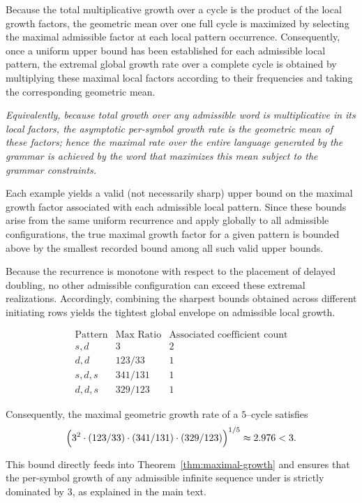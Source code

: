 \documentclass[12pt, oneside]{article}   	%
\numberwithin{equation}{section}          %
\theoremstyle{definition}
\begin{document}
Because the total multiplicative growth over a cycle is the product of the local
growth factors, the geometric mean over one full cycle is maximized by selecting
the maximal admissible factor at each local pattern occurrence. Consequently,
once a uniform upper bound has been established for each admissible local pattern,
the extremal global growth rate over a complete cycle is obtained by multiplying
these maximal local factors according to their frequencies and taking the
corresponding geometric mean.

\emph{Equivalently, because total growth over any admissible word is multiplicative in
its local factors, the asymptotic per-symbol growth rate is the geometric mean of these
factors;  hence the maximal rate over the entire language generated by the grammar is
achieved by the word that maximizes this mean subject to the grammar constraints.}

Each example yields a valid (not necessarily sharp) upper bound on the maximal growth
factor associated with each admissible local pattern.  Since these bounds arise from
the same uniform recurrence and apply globally to all admissible configurations, the
true maximal growth factor for a given pattern is bounded above by the smallest
recorded bound among all such valid upper bounds.

Because the recurrence is monotone with respect to the placement of delayed doubling,
no other admissible configuration can exceed these extremal realizations.
Accordingly, combining the sharpest bounds obtained across different initiating
rows yields the tightest global envelope on admissible local growth.

\[
\begin{array}{c|c|c}
\text{Pattern} & \text{Max Ratio} & \text{Associated coefficient count} \\
\hline
s,d & 3 & 2 \\
d,d & 123/33 & 1 \\
s,d,s & 341/131 & 1 \\
d,d,s & 329/123 & 1
\end{array}
\]

Consequently, the maximal geometric growth rate of a $5$--cycle satisfies
\begin{equation}
\Bigl(
3^2 \cdot (123/33) \cdot (341/131) \cdot (329/123)
\Bigr)^{1/5} 
\approx 2.976 < 3.
\label{eq:rho-5}
\end{equation}

This bound directly feeds into Theorem~\ref{thm:maximal-growth} and ensures that
the per-symbol growth of any admissible infinite sequence under 
is strictly dominated by $3$, as explained in the main text.
\end{document}
